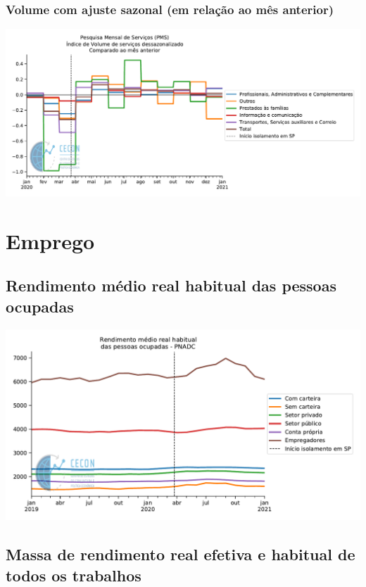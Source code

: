\documentclass{SelfArx}
\begin{document}
\subsubsection*{Volume com ajuste sazonal (em relação ao mês anterior)}
\label{sec:org902850c}


\begin{center}
\includegraphics[width=.9\linewidth]{./figs/Setoriais/PMS_vol_dessazonalizada_diff.pdf}
\end{center}

\section*{Emprego}
\label{sec:org8f38a93}

\subsection*{Rendimento médio real habitual das pessoas ocupadas}
\label{sec:org9e5d903}


\begin{center}
\includegraphics[width=.9\linewidth]{./figs/Emprego/RMHPO.pdf}
\end{center}

\subsection*{Massa de rendimento real efetiva e habitual de todos os trabalhos}
\label{sec:org875888e}
\end{document}
